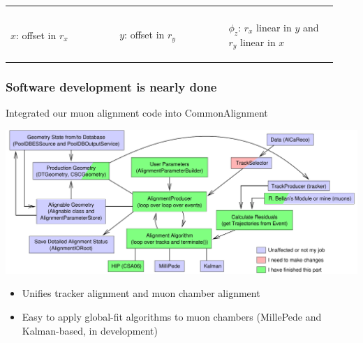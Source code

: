 \documentclass[compress]{beamer}
\begin{document}
\begin{frame}
{\begin{center}
\begin{tabular}{p{0.31\linewidth} p{0.31\linewidth} p{0.31\linewidth}}
\begin{minipage}{\linewidth}
  \end{minipage} \\
  \begin{minipage}{\linewidth}
    \begin{center}
      $x$: offset in $r_x$
    \end{center}
  \end{minipage} &
  \begin{minipage}{\linewidth}
    \begin{center}
      $y$: offset in $r_y$
    \end{center}
  \end{minipage} &
  \begin{minipage}{\linewidth}
    \begin{center}
      $\phi_z$: $r_x$ linear in $y$ and $r_y$ linear in $x$
    \end{center}
  \end{minipage}
\end{tabular}
\end{center}}

\vspace{-0.3 cm}
\end{frame}

\begin{frame}
\frametitle{Software development is nearly done}

Integrated our muon alignment code into CommonAlignment
\begin{center}
\includegraphics[width=0.9\linewidth]{plots/mine/software_flow_chart}
\end{center}

\begin{itemize}
  \item Unifies tracker alignment and muon chamber alignment
  \item Easy to apply global-fit algorithms to muon chambers
    (MillePede and Kalman-based, in development)
\end{itemize}
\end{frame}
\end{document}
